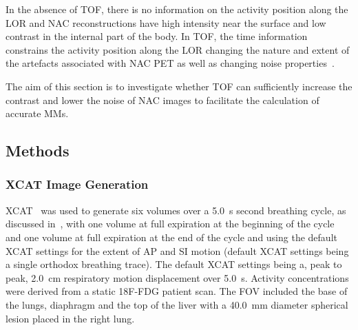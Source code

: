         In the absence of \gls{TOF}, there is no information on the activity position along the \gls{LOR} and \gls{NAC} reconstructions have high intensity near the surface and low contrast in the internal part of the body. In \gls{TOF}, the time information constrains the activity position along the \gls{LOR} changing the nature and extent of the artefacts associated with \gls{NAC} \gls{PET} as well as changing noise properties~\parencite{Ter-Pogossian1981}.
        
        The aim of this section is to investigate whether \gls{TOF} can sufficiently increase the contrast and lower the noise of \gls{NAC} images to facilitate the calculation of accurate \glspl{MM}.
        
        \subsection{Methods} \label{sec:impact_of_tof_on_respiratory_motion_model_estimation_using_pre_gated_no_intra_cycle_motion_nac_pet_methods}
            \subsubsection{XCAT Image Generation} \label{sec:impact_of_tof_on_respiratory_motion_model_estimation_using_pre_gated_no_intra_cycle_motion_nac_pet_methods_xcat_image_generation}
                \gls{XCAT}~\parencite{Segars2010} was used to generate six volumes over a \SI{5.0}{\second} second breathing cycle, as discussed in~, with one volume at full expiration at the beginning of the cycle and one volume at full expiration at the end of the cycle and using the default \gls{XCAT} settings for the extent of \gls{AP} and \gls{SI} motion (default \gls{XCAT} settings being a single orthodox breathing trace). The default \gls{XCAT} settings being a, peak to peak, \SI{2.0}{\centi\metre} respiratory motion displacement over \SI{5.0}{\second}. Activity concentrations were derived from a static \gls{18F-FDG} patient scan. The \gls{FOV} included the base of the lungs, diaphragm and the top of the liver with a \SI{40.0}{\milli\metre} diameter spherical lesion placed in the right lung.
            
